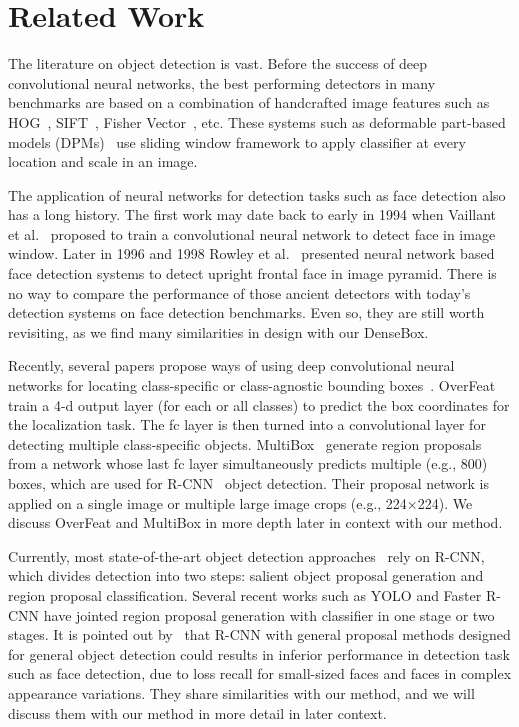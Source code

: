 \section{Related Work}

The literature on object detection is vast. Before the success of deep convolutional neural networks, the best performing detectors in many benchmarks are based on a combination of handcrafted image features such as HOG~\cite{dalal2005histograms}, SIFT~\cite{lowe2004distinctive}, Fisher Vector~\cite{cinbis2013segmentation}, etc. These systems such as deformable part-based models (DPMs)~\cite{felzenszwalb2010object, zhu2012face} use sliding window framework to apply classifier at every location and scale in an image.

The application of neural networks for detection tasks such as face detection also has a long history. The first work may date back to early in 1994 when Vaillant et al.~\cite{vaillant1994original} proposed to train a convolutional neural network to detect face in image window. Later in 1996 and 1998 Rowley et al.~\cite{rowley1998neural,rowley1998rotation} presented neural network based face detection systems to detect upright frontal face in image pyramid. There is no way to compare the performance of those ancient detectors with today’s detection systems on face detection benchmarks. Even so, they are still worth revisiting, as we find many similarities in design with our DenseBox. 

Recently, several papers propose ways of using deep convolutional neural networks for locating class-specific or class-agnostic bounding boxes~\cite{sermanet2013overfeat, erhan2014scalable, YOLO}. OverFeat~\cite{sermanet2013overfeat} train a 4-d output layer (for each or all classes) to predict the box coordinates for the localization task. The fc layer is then turned into a convolutional layer for detecting multiple class-specific objects. MultiBox~\cite{erhan2014scalable} generate region proposals from a network whose last fc layer simultaneously predicts multiple (e.g., 800) boxes, which are used for R-CNN~\cite{girshick2014rich} object detection. Their proposal network is applied on a single image or multiple large image crops (e.g., 224×224). We discuss OverFeat and MultiBox in more depth later in context with our method.

Currently, most state-of-the-art object detection approaches~\cite{ouyang2014deepid, li2015convolutional, erhan2014scalable,girshick2015fast} rely on R-CNN, which divides detection into two steps: salient object proposal generation and region proposal classification. Several recent works such as YOLO and Faster R-CNN have jointed region proposal generation with classifier in one stage or two stages. It is pointed out by~\cite{farfade2015multi} that R-CNN with general proposal methods designed for general object detection could results in inferior performance in detection task such as face detection, due to loss recall for small-sized faces and faces in complex appearance variations. They share similarities with our method, and we will discuss them with our method in more detail in later context.  

